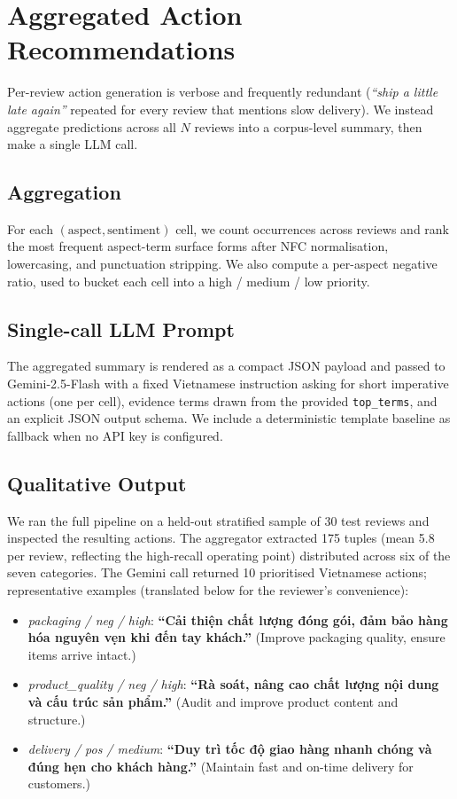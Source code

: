 \documentclass[conference]{IEEEtran}
\begin{document}
\section{Aggregated Action Recommendations}

Per-review action generation is verbose and frequently redundant
(\textit{``ship a little late again''} repeated for every review that
mentions slow delivery). We instead aggregate predictions across all
$N$ reviews into a corpus-level summary, then make a single LLM call.

\subsection{Aggregation}

For each $(\text{aspect}, \text{sentiment})$ cell, we count occurrences
across reviews and rank the most frequent aspect-term surface forms
after NFC normalisation, lowercasing, and punctuation stripping. We
also compute a per-aspect negative ratio, used to bucket each cell into
a high / medium / low priority.

\subsection{Single-call LLM Prompt}

The aggregated summary is rendered as a compact JSON payload and passed
to Gemini-2.5-Flash with a fixed Vietnamese instruction asking for
short imperative actions (one per cell), evidence terms drawn from the
provided \texttt{top\_terms}, and an explicit JSON output schema. We
include a deterministic template baseline as fallback when no API key
is configured.

\subsection{Qualitative Output}

We ran the full pipeline on a held-out stratified sample of 30 test
reviews and inspected the resulting actions. The aggregator extracted
175 tuples (mean 5.8 per review, reflecting the high-recall operating
point) distributed across six of the seven categories. The Gemini call
returned 10 prioritised Vietnamese actions; representative examples
(translated below for the reviewer's convenience):

\begin{itemize}
    \item \textit{packaging / neg / high}:
    \textbf{``Cải thiện chất lượng đóng gói, đảm bảo hàng hóa nguyên vẹn khi đến tay khách.''}
    (Improve packaging quality, ensure items arrive intact.)
    \item \textit{product\_quality / neg / high}:
    \textbf{``Rà soát, nâng cao chất lượng nội dung và cấu trúc sản phẩm.''}
    (Audit and improve product content and structure.)
    \item \textit{delivery / pos / medium}:
    \textbf{``Duy trì tốc độ giao hàng nhanh chóng và đúng hẹn cho khách hàng.''}
    (Maintain fast and on-time delivery for customers.)
\end{itemize}
\end{document}
